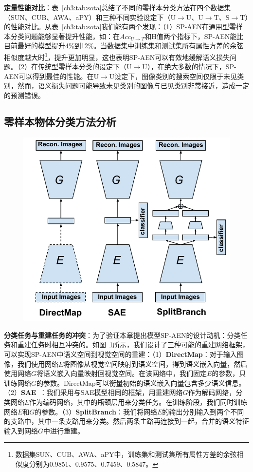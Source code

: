 \textbf{定量性能对比}：表~\ref{ch3:tab:sota}总结了不同的零样本分类方法在四个数据集（SUN、CUB、AWA、aPY）和三种不同实验设定下（U$\to$U、U$\to$T、S$\to$T）的性能对比。从表~\ref{ch3:tab:sota}我们能有两个发现：（1）SP-AEN在通用型零样本分类问题能够显著提升性能，如：在$Acc_{U\to T}$和H值两个指标下，SP-AEN能比目前最好的模型提升4\%到12\%。当数据集中训练集和测试集所有属性方差的余弦相似度越大时\footnote{数据集SUN、CUB、AWA、aPY中，训练集和测试集所有属性方差的余弦相似度分别为0.9851、0.9575、0.7459、0.5847。}，提升更加明显，这也表明SP-AEN可以有效地缓解语义损失问题。（2）在传统型零样本分类的设定下（U$\to$U），在绝大多数的情况下，SP-AEN可以得到最佳的性能。在U$\to$U设定下，图像类别的搜索空间仅限于未见类别，然而，语义损失问题可能导致未见类别的图像与已见类别非常接近，造成一定的预测错误。

\subsection{零样本物体分类方法分析}

\begin{figure}
    \centering
        \includegraphics[width=0.95\linewidth]{chapter3/res/conflict.pdf}
    \label{ch3:fig:conflict}
\end{figure}

\textbf{分类任务与重建任务的冲突}：为了验证本章提出模型SP-AEN的设计动机：分类任务和重建任务时相互冲突的。如图~\ref{ch3:fig:conflict}所示，我们设计了三种可能的重建网络框架，可以实现SP-AEN中语义空间到视觉空间的重建：（1）\textbf{DirectMap}：对于输入图像，我们使用网络$E$将图像从视觉空间映射到语义空间，得到语义嵌入向量，然后使用网络$G$将语义嵌入向量映射回视觉空间。在该网络中，我们固定$E$的参数，只训练网络$G$的参数。DirectMap可以衡量初始的语义嵌入向量包含多少语义信息。（2）\textbf{SAE}~\cite{kodirov2017semantic}：我们采用与SAE模型相同的框架，用重建网络$G$作为解码网络，分类网络$E$作为编码网络，其中的瓶颈层用来分类任务。在训练阶段，我们同时训练网络$E$和$G$的参数。（3）\textbf{SplitBranch}：我们将网络$E$的输出分别输入到两个不同的支路中，其中一条支路用来分类。然后两条主路再连接到一起，合并的语义特征输入到网络$G$中进行重建。


